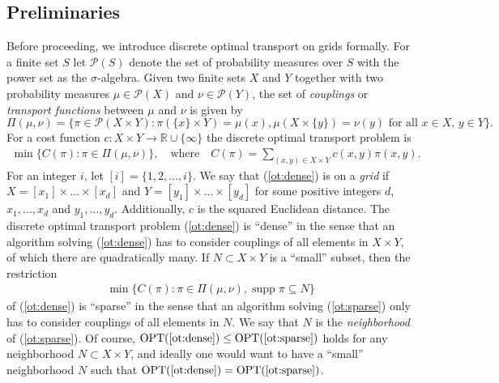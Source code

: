 \documentclass[a4paper,UKenglish,cleveref, autoref, thm-restate]{lipics-v2021}
\DeclareMathOperator{\supp}{supp}
\DeclareMathOperator{\OPT}{OPT}
\begin{document}
\subsection{Preliminaries}
Before proceeding, we introduce discrete optimal transport on grids formally.
For a finite set $S$ let $\mathcal{P}(S)$ denote the set of probability measures over $S$ with the power set as the $\sigma$-algebra.
Given two finite sets $X$ and $Y$ together with two probability measures $\mu \in \mathcal{P}(X)$ and $\nu \in \mathcal{P}(Y)$, the set of \emph{couplings} or \emph{transport functions} between $\mu$ and $\nu$ is given by
\[
\Pi(\mu,\nu) = \{\pi \in \mathcal{P}(X \times Y): \pi(\{x\} \times Y) = \mu(x), \mu(X \times \{y\}) = \nu(y) \text{ for all $x \in X$, $y \in Y$}\}.
\]
For a cost function $c: X \times Y \rightarrow \mathbb{R} \cup \{\infty\}$ the discrete optimal transport problem is
\begin{align}\tag{$P$}\label{ot:dense}
\min \{C(\pi) : \pi \in \Pi(\mu,\nu)\}, \quad\text{where}\quad C(\pi) = \sum_{(x,y) \in X \times Y} c(x,y)\pi(x,y).
\end{align}
For an integer $i$, let $[i] = \{1, 2, \dots, i\}$.
We say that (\ref{ot:dense}) is on a \emph{grid} if $X = [x_1] \times \dots \times [x_d]$ and $Y = [y_1] \times \dots \times [y_d]$ for some positive integers $d$, $x_1, \dots, x_d$ and $y_1, \dots, y_d$.
Additionally, $c$ is the squared Euclidean distance.
The discrete optimal transport problem (\ref{ot:dense}) is ``dense'' in the sense that an algorithm solving (\ref{ot:dense}) has to consider couplings of all elements in $X \times Y$, of which there are quadratically many.
If $N \subset X \times Y$ is a ``small'' subset, then the restriction
\begin{align}\tag{$P'$}\label{ot:sparse}
\min \{C(\pi) : \pi \in \Pi(\mu,\nu), \supp \pi \subseteq N\}
\end{align}
of (\ref{ot:dense}) is ``sparse'' in the sense that an algorithm solving (\ref{ot:sparse}) only has to consider couplings of all elements in $N$.
We say that $N$ is the \emph{neighborhood} of (\ref{ot:sparse}).
Of course, $\OPT(\text{\ref{ot:dense}}) \leq \OPT(\text{\ref{ot:sparse}})$ holds for any neighborhood $N \subset X \times Y$, and ideally one would want to have a ``small'' neighborhood $N$ such that $\OPT(\text{\ref{ot:dense}}) = \OPT(\text{\ref{ot:sparse}})$.
\end{document}
